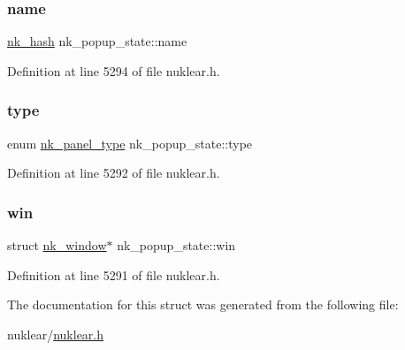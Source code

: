 \subsubsection{\texorpdfstring{name}{name}}
{\footnotesize\ttfamily \mbox{\hyperlink{nuklear_8h_a2123e2728db7d1f136b57d6528a0d757}{nk\+\_\+hash}} nk\+\_\+popup\+\_\+state\+::name}



Definition at line 5294 of file nuklear.\+h.

\mbox{\label{structnk__popup__state_af50698b4abee20445ffdd61584ed9740}} 
\subsubsection{\texorpdfstring{type}{type}}
{\footnotesize\ttfamily enum \mbox{\hyperlink{nuklear_8h_ae2eaaeccb136c68814c17bbc71496b99}{nk\+\_\+panel\+\_\+type}} nk\+\_\+popup\+\_\+state\+::type}



Definition at line 5292 of file nuklear.\+h.

\mbox{\label{structnk__popup__state_acce72ab5fd41fd54edf84d2a7915619c}} 
\subsubsection{\texorpdfstring{win}{win}}
{\footnotesize\ttfamily struct \mbox{\hyperlink{structnk__window}{nk\+\_\+window}}$\ast$ nk\+\_\+popup\+\_\+state\+::win}



Definition at line 5291 of file nuklear.\+h.



The documentation for this struct was generated from the following file\+:\begin{DoxyCompactItemize}
\item 
nuklear/\mbox{\hyperlink{nuklear_8h}{nuklear.\+h}}\end{DoxyCompactItemize}
